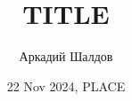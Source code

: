 \documentclass[9pt]{beamer}
\title{TITLE}
\author{Аркадий Шалдов}
\date{22 Nov 2024, PLACE}
\begin{document}

\begin{frame}
    \titlepage
\end{frame}
\end{document}
